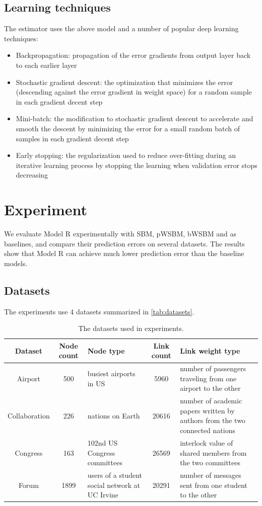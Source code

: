 \documentclass[conference]{IEEEtran}
\begin{document}
\subsection{Learning techniques}
The estimator uses the above model and a number of popular deep learning 
techniques:
\begin{itemize}
	\item Backpropagation: propagation of the error gradients from output layer 
	back to each earlier layer \cite{rumelhart1988learning}
	\item Stochastic gradient descent: the optimization that minimizes 
	the error (descending against the error gradient in weight space) for a 
	random sample in each gradient decent step \cite{lecun2012efficient}
	\item Mini-batch: the modification to stochastic gradient descent to 
	accelerate and smooth the descent by minimizing the error for a small 
	random batch of samples in each gradient decent step \cite{mairal2010online}
	\item Early stopping: the regularization used to reduce over-fitting during an iterative learning process by stopping the learning when validation error stops decreasing \cite{smale2007learning}
\end{itemize}

\section{Experiment}
We evaluate Model R experimentally with SBM, pWSBM, bWSBM and as baselines,
and compare their prediction errors on several datasets.
The results show 
that Model R can achieve much lower prediction error than the baseline models.

\subsection{Datasets}
The experiments use 4 datasets summarized in \autoref{tab:datasets}.
\begin{table}[!htb]\centering
	\caption{The datasets used in experiments.}
	\begin{tabularx}{\textwidth}{|c|c|X|c|X|}  \hline \rowcolor{blue!40}
		Dataset & Node count & Node type & Link count & Link weight type \\ \hline
		Airport\cite{colizza2007reaction} & 500 & busiest airports in US & 5960 & number of passengers traveling from one airport to the other\\ \hline
		Collaboration\cite{pan2012world} & 226 & nations on Earth & 20616 & number of academic papers written by authors from the two connected nations \\ \hline
		Congress\cite{porter2005network} & 163  & 102nd US Congress committees & 26569 & interlock value of shared members from the two committees \\ \hline
		Forum\cite{opsahl2009clustering}  & 1899 & users of a student social network at UC Irvine & 20291 & number of messages sent from one student to the other \\ \hline
	\end{tabularx}
	\label{tab:datasets}
\end{table}
\end{document}
